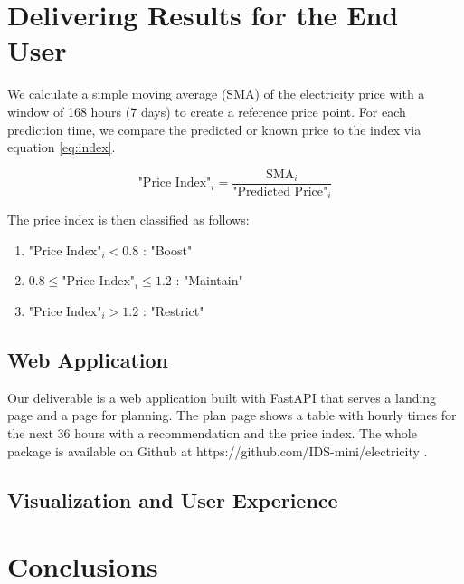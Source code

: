 \documentclass{article}
\begin{document}
\section{Delivering Results for the End User}
\label{section:delivery}

We calculate a simple moving average (SMA) of the electricity price with a window of 168 hours (7 days) to create a reference price point. For each prediction time, we compare the predicted or known price to the index via equation \ref{eq:index}.


\begin{equation} \label{eq:index}
\text{"Price Index"}_i = \frac{\text{SMA}_i}{\text{"Predicted Price"}_i}
\end{equation}

The price index is then classified as follows:

\begin{enumerate}
    \item $\text{"Price Index"}_i < 0.8$ : "Boost"
    \item $0.8 \leq \text{"Price Index"}_i \leq 1.2$ : "Maintain"
    \item $\text{"Price Index"}_i > 1.2$ : "Restrict"
\end{enumerate}

\subsection{Web Application}
\label{subsection:server}

Our deliverable is a web application built with FastAPI that serves a landing page and a page for planning. The plan page shows a table with hourly times for the next 36 hours with a recommendation and the price index. The whole package is available on Github at https://github.com/IDS-mini/electricity .

\subsection{Visualization and User Experience}
\label{subsection:ux}


\section{Conclusions}
\label{section:conclusions}

\end{document}
